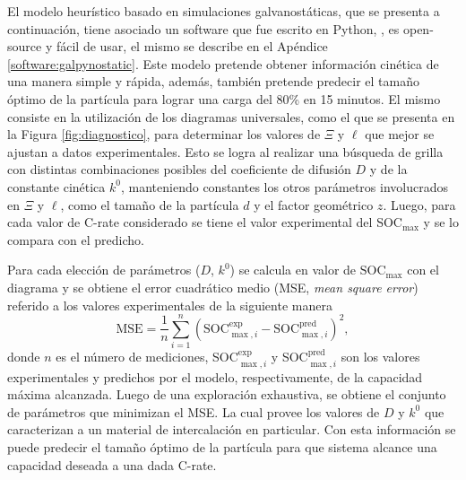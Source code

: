 El modelo heurístico basado en simulaciones galvanostáticas, que se presenta a 
continuación, tiene asociado un software que fue escrito en Python, 
, es open-source y fácil de usar, el mismo se describe en el
Apéndice \ref{software:galpynostatic}. Este modelo pretende obtener información
cinética de una manera simple y rápida, además, también pretende predecir el 
tamaño óptimo de la partícula para lograr una carga del 80\% en 15 minutos.
El mismo consiste en la utilización de los diagramas universales, como el que 
se presenta en la Figura \ref{fig:diagnostico}, para determinar los valores de
$\Xi$ y $\ell$ que mejor se ajustan a datos experimentales. Esto se logra al 
realizar una búsqueda de grilla con distintas combinaciones posibles del 
coeficiente de difusión $D$ y de la constante cinética $k^0$, manteniendo 
constantes los otros parámetros involucrados en $\Xi$ y $\ell$, como el tamaño 
de la partícula $d$ y el factor geométrico $z$. Luego, para cada valor de C-rate
considerado se tiene el valor experimental del SOC$_{\max}$ y se lo compara con 
el predicho.

Para cada elección de parámetros ($D$, $k^0$) se calcula en valor de 
$\text{SOC}_{\max}$ con el diagrama y se obtiene el error cuadrático medio (MSE,
\textit{mean square error}) referido a los valores experimentales de la siguiente
manera
\begin{equation}
    \text{MSE} = \frac{1}{n} \sum_{i=1}^n \left(\text{SOC}_{\max,i}^{\text{exp}} - \text{SOC}_{\max,i}^{\text{pred}}\right)^2,
\end{equation}
donde $n$ es el número de mediciones, SOC$_{\max, i}^{\exp}$ y 
SOC$_{\max, i}^{\text{pred}}$ son los valores experimentales y predichos por el 
modelo, respectivamente, de la capacidad máxima alcanzada. Luego de una 
exploración exhaustiva, se obtiene el conjunto de parámetros que minimizan el MSE. 
La cual provee los valores de $D$ y $k^0$ que caracterizan a un material de 
intercalación en particular. Con esta información se puede predecir el tamaño 
óptimo de la partícula para que sistema alcance una capacidad deseada a una dada 
C-rate.
